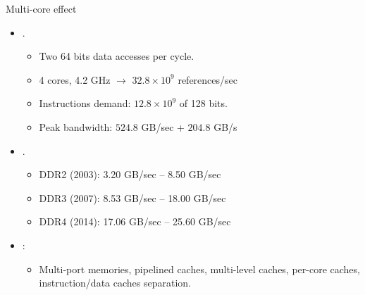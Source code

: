\begin{frame}[t]{Multi-core effect}
\begin{itemize}
  \item {}.
    \begin{itemize}
      \item Two 64 bits data accesses per cycle.
      \item 4 cores, 4.2 GHz $\rightarrow$ $32.8 \times 10^9$ references/sec
      \item Instructions demand: $12.8 \times 10^9$ of 128 bits.
      \item Peak bandwidth: $524.8$ GB/sec + $204.8$ GB/s
    \end{itemize}

  \item {}.
    \begin{itemize}
      \item DDR2 (2003): 3.20 GB/sec – 8.50 GB/sec
      \item DDR3 (2007):  8.53 GB/sec – 18.00 GB/sec
      \item DDR4 (2014): 17.06 GB/sec – 25.60 GB/sec
    \end{itemize}

  \item {}:
    \begin{itemize}
      \item Multi-port memories, pipelined caches, multi-level caches,
            per-core caches, instruction/data caches separation.
    \end{itemize}

\end{itemize}
\end{frame}

